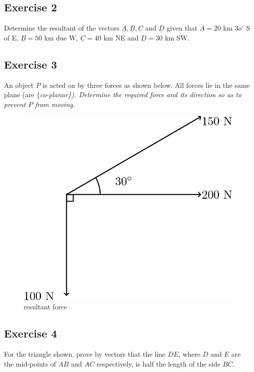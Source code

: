 \documentclass[
  11pt,
  oneside]{book}
\newcommand{\slide}{}
\theoremstyle{definition}
\theoremstyle{definition}
\theoremstyle{definition}
\theoremstyle{definition}
\theoremstyle{remark}
\begin{document}
\slide

\subsection*{Exercise 2}\label{exercise-2-12}

Determine the resultant of the vectors \(\underline A, \underline B, \underline C\) and \(\underline D\) given that \(\underline A = 20\) km \(3o^\circ\) S of E, \(\underline B = 50\) km due W, \(\underline C = 40\) km NE and \(\underline D=30\) km SW.

\slide

\subsection*{Exercise 3}\label{exercise-3-10}

An object \(P\) is acted on by three forces as shown below. All forces lie in the same plane (are \{\em co-planar\}). Determine the required force and its direction so as to prevent \(P\) from moving.

\begin{figure}

{\centering \includegraphics[width=0.4\linewidth]{tikztopng-figure43} 

}

\caption{resultant force}\label{fig:unnamed-chunk-97}
\end{figure}
\slide

\subsection*{Exercise 4}\label{exercise-4-8}

For the triangle shown, prove by vectors that the line \(DE\), where \(D\) and \(E\) are the mid-points of \(AB\) and \(AC\) respectively, is half the length of the side \(BC\).
\end{document}
